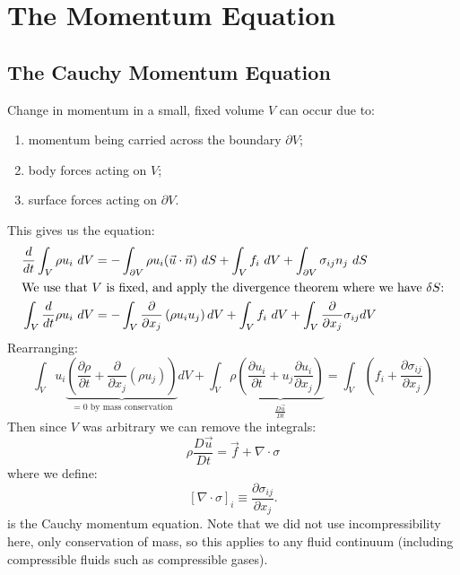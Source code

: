 \documentclass[../Main.tex]{subfiles}
\begin{document}
\section{The Momentum Equation}
\subsection{The Cauchy Momentum Equation}
Change in momentum in a small, fixed volume $V$ can occur due to:
\begin{enumerate}
    \item momentum being carried across the boundary $\partial V$;
    \item body forces acting on $V$;
    \item surface forces acting on $\partial V$.
\end{enumerate}
This gives us the equation:
\begin{align*}
    \frac{d}{dt} \int_V \rho u_i~dV &= - \int_{\partial V} \rho u_i (\vec{u} \cdot \vec{n})~dS + \int_V f_i~dV + \int_{\partial V} \sigma_{ij} n_j~dS \\
    \intertext{We use that $V$ is fixed, and apply the divergence theorem where we have $\delta S$:}
    \int_V \frac{d}{dt} \rho u_i~dV &= - \int_V \frac{\partial}{\partial x_j} \left(\rho u_i u_j\right)dV + \int_V f_i~dV + \int_V \frac{\partial}{\partial x_j}\sigma_{ij} dV 
\end{align*}
Rearranging:
\begin{equation*}
    \int_V u_i \underbrace{\left(\frac{\partial \rho}{\partial t} + \frac{\partial}{\partial x_j}(\rho u_j)\right)}_{=0 \text{ by mass conservation}} dV + \int_V \rho \underbrace{\left(\frac{\partial u_i}{\partial t} + u_j \frac{\partial u_i}{\partial x_j}\right)}_{\frac{D \vec{u}}{D t}}= \int_V \left(f_i + \frac{\partial \sigma_{ij}}{\partial x_j}\right)
\end{equation*}
Then since $V$ was arbitrary we can remove the integrals:
\begin{equation}
    \rho \frac{D \vec{u}}{D t} = \vec{f} + \nabla \cdot \sigma
    \label{eqnCauchyMom}
\end{equation}
where we define:
\begin{equation*}
    \left[\nabla \cdot \sigma\right]_i \equiv \frac{\partial \sigma_{ij}}{\partial x_j}.
\end{equation*}
 is the Cauchy momentum equation. Note that we did not use incompressibility here, only conservation of mass, so this applies to any fluid continuum (including compressible fluids such as compressible gases).
\end{document}
